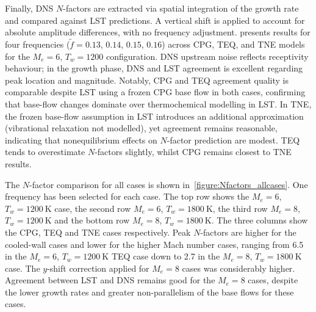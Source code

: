 Finally, \gls{DNS} $N$-factors are extracted via spatial integration of the growth rate and compared against \gls{LST} predictions. A vertical shift is applied to account for absolute amplitude differences, with no frequency adjustment.  presents results for four frequencies ($\tilde{f}=0.13$, $0.14$, $0.15$, $0.16$) across \gls{CPG}, \gls{TEQ}, and \gls{TNE} models for the $M_e=6$, $T_w=1200$ configuration. \gls{DNS} upstream noise reflects receptivity behaviour; in the growth phase, \gls{DNS} and \gls{LST} agreement is excellent regarding peak location and magnitude. Notably, \gls{CPG} and \gls{TEQ} agreement quality is comparable despite \gls{LST} using a frozen \gls{CPG} base flow in both cases, confirming that base-flow changes dominate over thermochemical modelling in \gls{LST}. In \gls{TNE}, the frozen base-flow assumption in \gls{LST} introduces an additional approximation (vibrational relaxation not modelled), yet agreement remains reasonable, indicating that nonequilibrium effects on $N$-factor prediction are modest. \gls{TEQ} tends to overestimate $N$-factors slightly, whilst \gls{CPG} remains closest to \gls{TNE} results.


The $N$-factor comparison for all cases is shown in~\cref{figure:Nfactors_allcases}. One frequency has been selected for each case. The top row shows the $M_e=6$, $T_w=1200~\mathrm{K}$ case, the second row $M_e=6$, $T_w=1800~\mathrm{K}$, the third row $M_e=8$, $T_w=1200~\mathrm{K}$ and the bottom row $M_e=8$, $T_w=1800~\mathrm{K}$. The three columns show the CPG, TEQ and TNE cases respectively. Peak $N$-factors are higher for the cooled-wall cases and lower for the higher Mach number cases, ranging from 6.5 in the $M_e=6$, $T_w=1200~\mathrm{K}$ TEQ case down to 2.7 in the $M_e=8$, $T_w=1800~\mathrm{K}$ case. The $y$-shift correction applied for $M_e=8$ cases was considerably higher. Agreement between LST and DNS remains good for the $M_e=8$ cases, despite the lower growth rates and greater non-parallelism of the base flows for these cases.

